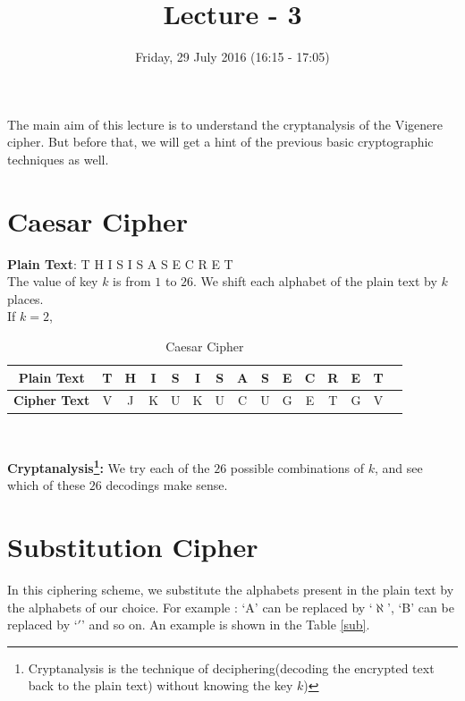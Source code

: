 \documentclass{llncs}
\title{Lecture - 3}
\author{Friday, 29 July 2016 (16:15 - 17:05)}
\institute{Puzzles : Cryptanalysis of Vigenere Cipher}
\begin{document}
\maketitle
\vspace{5mm}
The main aim of this lecture is to understand the cryptanalysis of the Vigenere cipher. But before that, we will get a hint of the previous basic cryptographic techniques as well. 

\section{Caesar Cipher}
\textbf{Plain Text}:\hspace{1mm} T H I S I S A S E C R E T\\

The value of key $k$ is from $1$ to $26$. We shift each alphabet of the plain text by $k$ places. \\
If $k=2$,

\begin{table}[h]
\begin{center}
\begin{tabular}{ |c|c|c|c|c|c|c|c|c|c|c|c|c|c|c| }
\hline
\textbf{Plain Text} & T & H & I & S & I & S & A & S & E & C & R & E & T \\
\hline
\textbf{Cipher Text} & V & J & K & U & K & U & C & U & G & E & T & G & V \\
\hline
\end{tabular}\\
\vspace{2mm}
\caption{Caesar Cipher}
\label{caesar}
\end{center}
\end{table}



\textbf{Cryptanalysis\footnote{Cryptanalysis is the technique of deciphering(decoding the encrypted text back to the plain text) without knowing the key $k$)}:}
We try each of the $26$ possible combinations of $k$, and see which of these $26$ decodings make sense. 

\section{Substitution Cipher}
In this ciphering scheme, we substitute the alphabets present in the plain text by the alphabets of our choice. For example : `A' can be replaced by `$\aleph$', `B' can be replaced by `$\prime$' and so on. 
An example is shown in the Table \ref{sub}.
\end{document}
